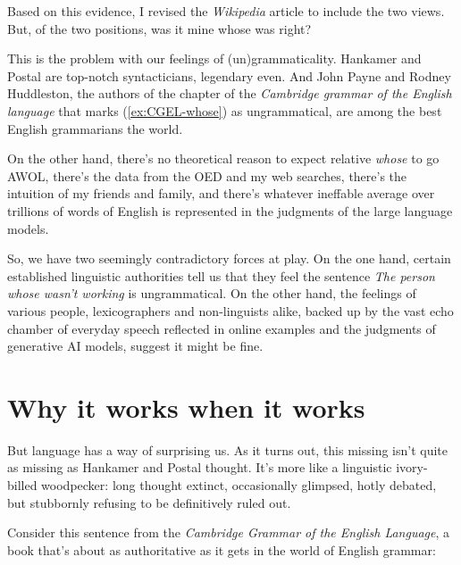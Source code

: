 Based on this evidence, I revised the \textit{Wikipedia} article to include the two views. But, of the two positions, was it mine whose was right?

This is the problem with our feelings of (un)grammaticality. Hankamer and Postal are top-notch syntacticians, legendary even. And John Payne and Rodney Huddleston, the authors of the chapter of the \textit{Cambridge grammar of the English language} that marks (\ref{ex:CGEL-whose}) as ungrammatical, are among the best English grammarians the world.

On the other hand, there's no theoretical reason to expect relative \textit{whose} to go AWOL, there's the data from the OED and my web searches, there's the intuition of my friends and family, and there's whatever ineffable average over trillions of words of English is represented in the judgments of the large language models.

So, we have two seemingly contradictory forces at play. On the one hand, certain established linguistic authorities tell us that they feel the sentence \textit{The person whose wasn't working} is ungrammatical. On the other hand, the feelings of various people, lexicographers and non-linguists alike, backed up by the vast echo chamber of everyday speech reflected in online examples and the judgments of generative AI models, suggest it might be fine.

\section{Why it works when it works}

But language has a way of surprising us. As it turns out, this missing  isn't quite as missing as Hankamer and Postal thought. It's more like a linguistic ivory-billed woodpecker: long thought extinct, occasionally glimpsed, hotly debated, but stubbornly refusing to be definitively ruled out.

Consider this sentence from the \textit{Cambridge Grammar of the English Language}, a book that's about as authoritative as it gets in the world of English grammar:

\z

